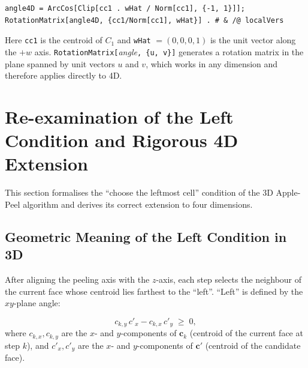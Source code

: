 \documentclass[12pt,a4paper]{article}
\theoremstyle{definition}
\begin{document}
\begin{lstlisting}
angle4D = ArcCos[Clip[cc1 . wHat / Norm[cc1], {-1, 1}]];
RotationMatrix[angle4D, {cc1/Norm[cc1], wHat}] . # & /@ localVers
\end{lstlisting}

\noindent
Here \texttt{cc1} is the centroid of $C_1$ and
\texttt{wHat} $= (0,0,0,1)$ is the unit vector along the $+w$ axis.
\texttt{RotationMatrix[}\textit{angle}\texttt{, \{u, v\}]} generates a rotation
matrix in the plane spanned by unit vectors $u$ and $v$,
which works in any dimension and therefore applies directly to 4D.


\section{Re-examination of the Left Condition and Rigorous 4D Extension}
\label{sec:left}

This section formalises the ``choose the leftmost cell'' condition of the
3D Apple-Peel algorithm and derives its correct extension to four dimensions.

\subsection{Geometric Meaning of the Left Condition in 3D}

After aligning the peeling axis with the $z$-axis, each step selects the
neighbour of the current face whose centroid lies farthest to the ``left''.
``Left'' is defined by the $xy$-plane angle:

\begin{equation}
  c_{k,y}\, c'_x - c_{k,x}\, c'_y \;\ge\; 0,
  \label{eq:3dleft}
\end{equation}
where $c_{k,x}, c_{k,y}$ are the $x$- and $y$-components of $\mathbf{c}_k$
(centroid of the current face at step $k$), and $c'_x, c'_y$ are
the $x$- and $y$-components of $\mathbf{c}'$ (centroid of the candidate face).
\end{document}
